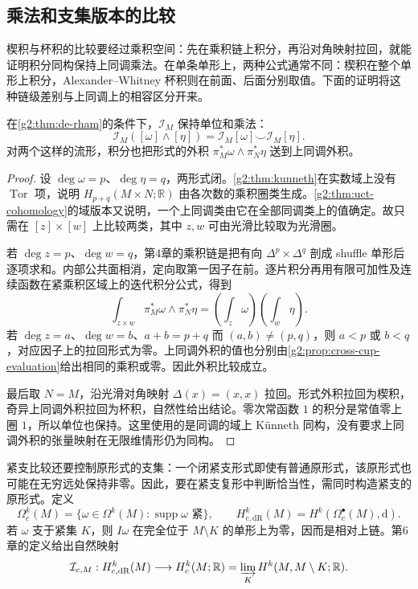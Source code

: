 \subsection{乘法和支集版本的比较}
\label{g2:subsec:0703:05}
楔积与杯积的比较要经过乘积空间：先在乘积链上积分，再沿对角映射拉回，就能证明积分同构保持上同调乘法。在单条单形上，两种公式通常不同：楔积在整个单形上积分，Alexander--Whitney 杯积则在前面、后面分别取值。下面的证明将这种链级差别与上同调上的相容区分开来。

\begin{proposition}\label{g2:prop:de-rham-products}
	在\cref{g2:thm:de-rham}的条件下，\(\mathcal I_M\) 保持单位和乘法：
	\[
		\mathcal I_M([\omega]\wedge[\eta])
		=\mathcal I_M[\omega]\smile\mathcal I_M[\eta].
	\]
	对两个这样的流形，积分也把形式的外积 \(\pi_M^*\omega\wedge\pi_N^*\eta\) 送到上同调外积。
\end{proposition}
\begin{proof}
	设 \(\deg\omega=p\)、\(\deg\eta=q\)，两形式闭。\cref{g2:thm:kunneth}在实数域上没有 \(\operatorname{Tor}\) 项，说明 \(H_{p+q}(M\times N;\mathbb R)\) 由各次数的乘积圈类生成。\cref{g2:thm:uct-cohomology}的域版本又说明，一个上同调类由它在全部同调类上的值确定。故只需在 \([z]\times[w]\) 上比较两类，其中 \(z,w\) 可由光滑比较取为光滑圈。

	若 \(\deg z=p\)、\(\deg w=q\)，第4章的乘积链是把有向 \(\Delta^p\times\Delta^q\) 剖成 shuffle 单形后逐项求和。内部公共面相消，定向取第一因子在前。逐片积分再用有限可加性及连续函数在紧乘积区域上的迭代积分公式，得到
	\[
		\int_{z\times w}\pi_M^*\omega\wedge\pi_N^*\eta
		=\left(\int_z\omega\right)\left(\int_w\eta\right).
	\]
	若 \(\deg z=a\)、\(\deg w=b\)、\(a+b=p+q\) 而 \((a,b)\ne(p,q)\)，则 \(a<p\) 或 \(b<q\)，对应因子上的拉回形式为零。上同调外积的值也分别由\cref{g2:prop:cross-cup-evaluation}给出相同的乘积或零。因此外积比较成立。

	最后取 \(N=M\)，沿光滑对角映射 \(\Delta(x)=(x,x)\) 拉回。形式外积拉回为楔积，奇异上同调外积拉回为杯积，自然性给出结论。零次常函数 \(1\) 的积分是常值零上圈 \(1\)，所以单位也保持。这里使用的是同调的域上 Künneth 同构，没有要求上同调外积的张量映射在无限维情形仍为同构。
\end{proof}

紧支比较还要控制原形式的支集：一个闭紧支形式即使有普通原形式，该原形式也可能在无穷远处保持非零。因此，要在紧支复形中判断恰当性，需同时构造紧支的原形式。定义
\[
	\Omega_c^k(M)=\{\omega\in\Omega^k(M):\operatorname{supp}\omega\text{ 紧}\},
	\qquad H_{c,\mathrm{dR}}^k(M)=H^k(\Omega_c^\bullet(M),\mathrm d).
\]
若 \(\omega\) 支于紧集 \(K\)，则 \(I\omega\) 在完全位于 \(M\setminus K\) 的单形上为零，因而是相对上链。第6章的定义给出自然映射
\[
	\mathcal I_{c,M}:H_{c,\mathrm{dR}}^k(M)\longrightarrow
	H_c^k(M;\mathbb R)=\varinjlim_K H^k(M,M\setminus K;\mathbb R).
\]

